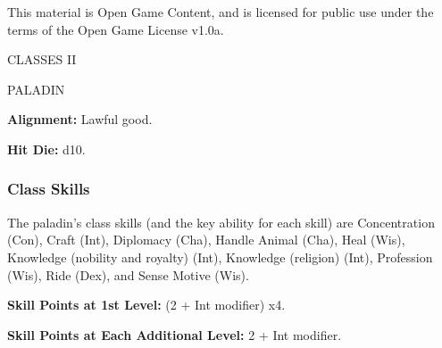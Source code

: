 \documentclass{article}
\begin{document}
This material is Open Game Content, and is licensed for public use under the terms 
of the Open Game License v1.0a.

{\LARGE{}CLASSES II}

\vspace{12pt}
{\LARGE{}PALADIN}

\textbf{Alignment: }Lawful good.

\textbf{Hit Die:} d10.

\vspace{12pt}
\subsubsection*{\textbf{Class Skills}}

The paladin's class skills (and the key ability for each skill) are Concentration 
(Con), Craft (Int), Diplomacy (Cha), Handle Animal (Cha), Heal (Wis), Knowledge 
(nobility and royalty) (Int), Knowledge (religion) (Int), Profession (Wis), Ride 
(Dex), and Sense Motive (Wis).

\textbf{Skill Points at 1st Level:} (2 + Int modifier) x4.

\textbf{Skill Points at Each Additional Level:} 2 + Int modifier.
\end{document}
